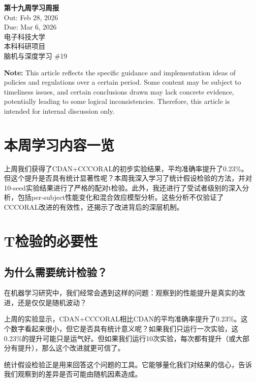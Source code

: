 \documentclass[12pt,a4paper]{ctexart}
\begin{document}
\begin{center}
    {\LARGE \textbf{第十九周学习周报}}\\[0.5cm]
    {\large Out: Feb 28, 2026}\\
    {\large Due: Mar 6, 2026}\\[0.5cm]
    {\large 电子科技大学}\\
    {\large 本科科研项目}\\
    {\large 脑机与深度学习 \#19}
\end{center}

\vspace{1cm}

\noindent \textbf{Note:} This article reflects the specific guidance and implementation ideas of policies and regulations over a certain period. Some content may be subject to timeliness issues, and certain conclusions drawn may lack concrete evidence, potentially leading to some logical inconsistencies. Therefore, this article is intended for internal discussion only.

\section{本周学习内容一览}

上周我们获得了CDAN+CCCORAL的初步实验结果，平均准确率提升了0.23\%。但这个提升是否具有统计显著性呢？本周我深入学习了统计假设检验的方法，并对10-seed实验结果进行了严格的配对t检验。此外，我还进行了受试者级别的深入分析，包括per-subject性能变化和混合效应模型分析。这些分析不仅验证了CCCORAL改进的有效性，还揭示了改进背后的深层机制。

\section{T检验的必要性}

\subsection{为什么需要统计检验？}

在机器学习研究中，我们经常会遇到这样的问题：观察到的性能提升是真实的改进，还是仅仅是随机波动？

上周的实验显示，CDAN+CCCORAL相比CDAN的平均准确率提升了0.23\%。这个数字看起来很小，但它是否具有统计意义呢？如果我们只运行一次实验，这0.23\%的提升可能只是运气好。但如果我们运行10次实验，每次都有提升（或大部分有提升），那么这个改进就更可信了。

统计假设检验正是用来回答这个问题的工具。它能够量化我们对结果的信心，告诉我们观察到的差异是否可能由随机因素造成。
\end{document}
